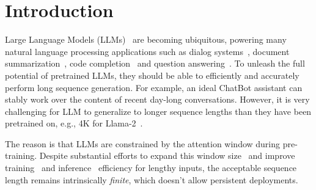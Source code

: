 \section{Introduction}
Large Language Models (LLMs)~\citep{radford2018improving,brown2020language,zhang2022opt,openai2023gpt4,touvron2023llama,touvron2023llama2} are becoming ubiquitous, powering many natural language processing applications such as dialog systems~\citep{schulman2022chatgpt,alpaca,vicuna2023}, document summarization~\citep{goyal-durrett-2020-evaluating,zhang2023benchmarking}, code completion~\citep{chen2021evaluating,rozière2023code}  and question answering~\citep{kamalloo2023evaluating}. To unleash the full potential of pretrained LLMs, they should be able to efficiently and accurately perform long sequence generation. For example, an ideal ChatBot assistant can stably work over the content of recent day-long conversations. However, it is very challenging for LLM to generalize to longer sequence lengths than they have been pretrained on, e.g., 4K for Llama-2~\cite{touvron2023llama2}. 

The reason is that LLMs are constrained by the attention window during pre-training. Despite substantial efforts to expand this window size~\citep{chen2023extending,kaiokendev,peng2023yarn} and improve training~\citep{dao2022flashattention,dao2023flashattention2} and inference~\citep{pope2022efficiently,xiao2023smoothquant,anagnostidis2023dynamic,wang2021spatten,zhang2023h2o} efficiency for lengthy inputs, the acceptable sequence length remains intrinsically \emph{finite}, which doesn't allow persistent deployments.

